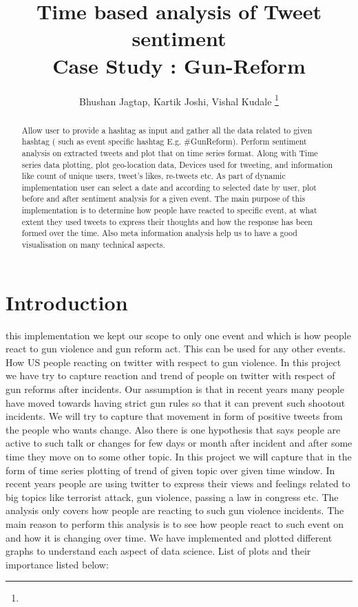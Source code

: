 \documentclass[journal, a4paper]{IEEEtran}
\begin{document}
	\title{Time based analysis of Tweet sentiment\\ \LARGE{Case Study : Gun-Reform} }
	\author{Bhushan Jagtap, Kartik Joshi, Vishal Kudale
	\thanks{}}
	\markboth{}{}
	\maketitle

\begin{abstract}
	Allow user to provide a hashtag as input and gather all the data related to given hashtag ( such as event specific hashtag E.g. \#GunReform). Perform sentiment analysis on extracted tweets and plot that on time series format.  Along with Time series data plotting, plot geo-location data, Devices used for tweeting, and information like count of unique users, tweet’s likes, re-tweets etc. As part of dynamic implementation user can select a date and according to selected date by user, plot  before and after sentiment analysis for a given event. The main purpose of this implementation is to determine how people have reacted to specific event, at what extent they used tweets to express their thoughts and how the response has been formed over the time. Also meta information analysis help us to have a good visualisation on many technical aspects.
\end{abstract}

\section{Introduction}
	 this implementation we kept our scope to only one event and which is how people react to gun violence and gun reform act. This can be used for any other events. How US people reacting on twitter with respect to gun violence. In this project we have try to capture reaction and trend of people on twitter with respect of gun reforms after incidents. Our assumption is that in recent years many people have moved towards having strict gun rules so that it can prevent such shootout incidents. We will try to capture that movement in form of positive tweets from the people who wants change. Also there is one hypothesis that says people are active to such talk or changes for few days or month after incident and after some time they move on to some other topic. In this project we will capture that in the form of time series plotting of trend of given topic over given time window. In recent years people are using twitter to express their views and feelings related to big topics like terrorist attack, gun violence, passing a law in congress etc. The analysis only covers how people are reacting to such gun violence incidents.
The main reason to perform this analysis is to see how people react to such event on and how it is changing over time. We have implemented and plotted different graphs to understand each aspect of data science. List of plots and their importance listed below:
\end{document}
